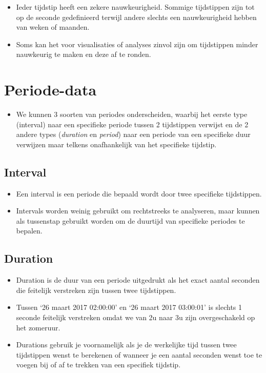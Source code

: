 \documentclass[]{tufte-book}
\providecommand{\tightlist}{%
  \setlength{\itemsep}{0pt}\setlength{\parskip}{0pt}}
\begin{document}
\begin{itemize}
\tightlist
\item
  Ieder tijdstip heeft een zekere nauwkeurigheid. Sommige tijdstippen zijn tot op de seconde gedefinieerd terwijl andere slechts een nauwkeurigheid hebben van weken of maanden.
\item
  Soms kan het voor visualisaties of analyses zinvol zijn om tijdstippen minder nauwkeurig te maken en deze af te ronden.
\end{itemize}

\hypertarget{periode-data}{%
\section{Periode-data}\label{periode-data}}

\begin{itemize}
\tightlist
\item
  We kunnen 3 soorten van periodes onderscheiden, waarbij het eerste type (interval) naar een specifieke periode tussen 2 tijdstippen verwijst en de 2 andere types (\emph{duration} en \emph{period}) naar een periode van een specifieke duur verwijzen maar telkens onafhankelijk van het specifieke tijdstip.
\end{itemize}

\hypertarget{interval-1}{%
\subsection{Interval}\label{interval-1}}

\begin{itemize}
\tightlist
\item
  Een interval is een periode die bepaald wordt door twee specifieke tijdstippen.
\item
  Intervals worden weinig gebruikt om rechtstreeks te analyseren, maar kunnen als tussenstap gebruikt worden om de duurtijd van specifieke periodes te bepalen.
\end{itemize}

\hypertarget{duration}{%
\subsection{Duration}\label{duration}}

\begin{itemize}
\tightlist
\item
  Duration is de duur van een periode uitgedrukt als het exact aantal seconden die feitelijk verstreken zijn tussen twee tijdstippen.
\item
  Tussen `26 maart 2017 02:00:00' en `26 maart 2017 03:00:01' is slechts 1 seconde feitelijk verstreken omdat we van 2u naar 3u zijn overgeschakeld op het zomeruur.
\item
  Durations gebruik je voornamelijk als je de werkelijke tijd tussen twee tijdstippen wenst te berekenen of wanneer je een aantal seconden wenst toe te voegen bij of af te trekken van een specifiek tijdstip.
\end{itemize}
\end{document}

